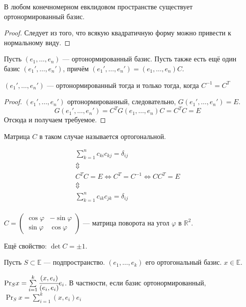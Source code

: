 \begin{Theorem}
	В любом конечномерном евклидовом пространстве существует ортонормированный базис.
\end{Theorem}
\begin{proof}
	Следует из того, что всякую квадратичную форму можно привести к нормальному виду. 
\end{proof}
Пусть $(e_1, \ldots, e_n)$ --- ортонормированный базис. Пусть также есть ещё один базис $(e_1', \ldots, e_n')$, причём $(e_1', \ldots, e_n') = (e_1, \ldots, e_n)C$. 
\begin{Suggestion}
	$(e_1', \ldots, e_n')$ --- ортонормированный тогда и только тогда, когда $C^{-1} = C^T$
\end{Suggestion}
\begin{proof}
	$(e_1', \ldots, e_n')$ ортонормированный, следовательно, $G(e_1', \ldots, e_n') = E$.
	\[
		G(e_1', \ldots, e_n') = C^TG(e_1, \ldots, e_n)C = C^TC = E
	\]
	Отсюда и получаем требуемое.
\end{proof}
\begin{Def}
	Матрица $C$ в таком случае называется ортогональной.
\end{Def}
\begin{Properties}
	\begin{gather*}
		\sum\limits_{k = 1}^{n}c_{ki}c_{kj} = \delta_{ij}\\
		\Updownarrow\\
		C^TC= E	\Leftrightarrow C^T = C^{-1}\Leftrightarrow CC^T = E\\
		\Updownarrow\\
		\sum\limits_{k = 1}^{n}c_{ik}c_{jk} = \delta_{ij}\\
	\end{gather*}
\end{Properties}
\begin{Examples}
	$C = \begin{pmatrix}
	\cos \varphi& -\sin \varphi\\
	\sin \varphi& \cos \varphi
	\end{pmatrix}$ --- матрица поворота на угол $\varphi$ в $\mathbb{R}^2$.
\end{Examples}
\par Ещё свойство: $\det C = \pm 1$.
\par Пусть $S \subset \mathbb{E}$ --- подпространство. $(e_1, \ldots, e_k)$ его ортогональный базис. $x \in \mathbb{E}$.
\begin{Suggestion}
	$\Pr_S x = \sum\limits_{i = 1}^{k}\cfrac{(x,e_i)}{(e_i, e_i)}e_i$. В частности, если базис ортонормированный, $\Pr_S x = \sum\limits_{i = 1}^{k}(x,e_i)e_i$
\end{Suggestion}
